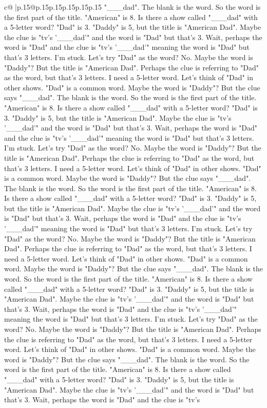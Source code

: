 \documentclass{article}
\begin{document}
{\begin{supertabular}{c@{$\;$}|p{.15\linewidth}@{}p{.15\linewidth}p{.15\linewidth}p{.15\linewidth}p{.15\linewidth}p{.15\linewidth}}
{{{"\_\_\_dad". The blank is the word. So the word is the first part of the title. "American" is 8. Is there a show called "\_\_\_dad" with a 5{-}letter word? "Dad" is 3. "Daddy" is 5, but the title is "American Dad". Maybe the clue is "tv's '\_\_\_dad'" and the word is "Dad" but that's 3. Wait, perhaps the word is "Dad" and the clue is "tv's '\_\_\_dad'" meaning the word is "Dad" but that's 3 letters. I'm stuck. Let's try "Dad" as the word? No. Maybe the word is "Daddy"? But the title is "American Dad". Perhaps the clue is referring to "Dad" as the word, but that's 3 letters. I need a 5{-}letter word. Let's think of "Dad" in other shows. "Dad" is a common word. Maybe the word is "Daddy"? But the clue says "\_\_\_dad". The blank is the word. So the word is the first part of the title. "American" is 8. Is there a show called "\_\_\_dad" with a 5{-}letter word? "Dad" is 3. "Daddy" is 5, but the title is "American Dad". Maybe the clue is "tv's '\_\_\_dad'" and the word is "Dad" but that's 3. Wait, perhaps the word is "Dad" and the clue is "tv's '\_\_\_dad'" meaning the word is "Dad" but that's 3 letters. I'm stuck. Let's try "Dad" as the word? No. Maybe the word is "Daddy"? But the title is "American Dad". Perhaps the clue is referring to "Dad" as the word, but that's 3 letters. I need a 5{-}letter word. Let's think of "Dad" in other shows. "Dad" is a common word. Maybe the word is "Daddy"? But the clue says "\_\_\_dad". The blank is the word. So the word is the first part of the title. "American" is 8. Is there a show called "\_\_\_dad" with a 5{-}letter word? "Dad" is 3. "Daddy" is 5, but the title is "American Dad". Maybe the clue is "tv's '\_\_\_dad'" and the word is "Dad" but that's 3. Wait, perhaps the word is "Dad" and the clue is "tv's '\_\_\_dad'" meaning the word is "Dad" but that's 3 letters. I'm stuck. Let's try "Dad" as the word? No. Maybe the word is "Daddy"? But the title is "American Dad". Perhaps the clue is referring to "Dad" as the word, but that's 3 letters. I need a 5{-}letter word. Let's think of "Dad" in other shows. "Dad" is a common word. Maybe the word is "Daddy"? But the clue says "\_\_\_dad". The blank is the word. So the word is the first part of the title. "American" is 8. Is there a show called "\_\_\_dad" with a 5{-}letter word? "Dad" is 3. "Daddy" is 5, but the title is "American Dad". Maybe the clue is "tv's '\_\_\_dad'" and the word is "Dad" but that's 3. Wait, perhaps the word is "Dad" and the clue is "tv's '\_\_\_dad'" meaning the word is "Dad" but that's 3 letters. I'm stuck. Let's try "Dad" as the word? No. Maybe the word is "Daddy"? But the title is "American Dad". Perhaps the clue is referring to "Dad" as the word, but that's 3 letters. I need a 5{-}letter word. Let's think of "Dad" in other shows. "Dad" is a common word. Maybe the word is "Daddy"? But the clue says "\_\_\_dad". The blank is the word. So the word is the first part of the title. "American" is 8. Is there a show called "\_\_\_dad" with a 5{-}letter word? "Dad" is 3. "Daddy" is 5, but the title is "American Dad". Maybe the clue is "tv's '\_\_\_dad'" and the word is "Dad" but that's 3. Wait, perhaps the word is "Dad" and the clue is "tv's }}}
\end{supertabular}}
\end{document}
